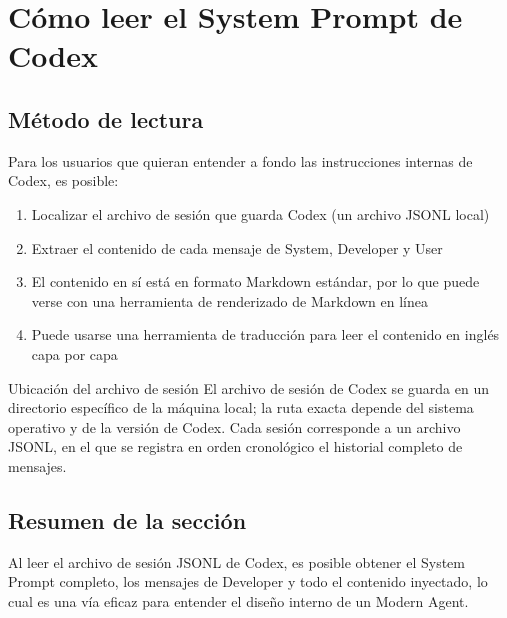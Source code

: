\section{Cómo leer el System Prompt de Codex}

\subsection{Método de lectura}

Para los usuarios que quieran entender a fondo las instrucciones internas de Codex, es posible:

\begin{enumerate}
    \item Localizar el archivo de sesión que guarda Codex (un archivo JSONL local)
    \item Extraer el contenido de cada mensaje de System, Developer y User
    \item El contenido en sí está en formato Markdown estándar, por lo que puede verse con una herramienta de renderizado de Markdown en línea
    \item Puede usarse una herramienta de traducción para leer el contenido en inglés capa por capa
\end{enumerate}

\begin{warningbox}{Ubicación del archivo de sesión}
El archivo de sesión de Codex se guarda en un directorio específico de la máquina local; la ruta exacta depende del sistema operativo y de la versión de Codex. Cada sesión corresponde a un archivo JSONL, en el que se registra en orden cronológico el historial completo de mensajes.
\end{warningbox}

\subsection{Resumen de la sección}

Al leer el archivo de sesión JSONL de Codex, es posible obtener el System Prompt completo, los mensajes de Developer y todo el contenido inyectado, lo cual es una vía eficaz para entender el diseño interno de un Modern Agent.


